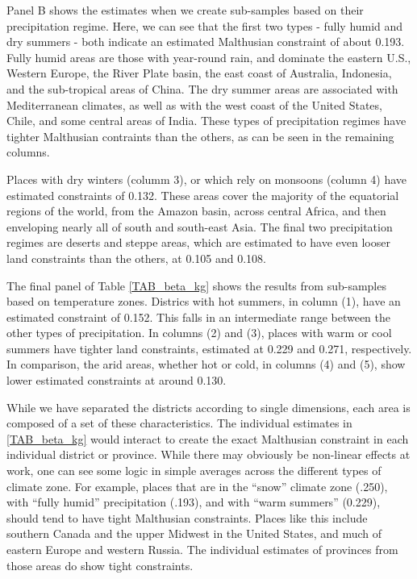 \documentclass[11pt]{article}
\begin{document}
Panel B shows the estimates when we create sub-samples based on their precipitation regime. Here, we can see that the first two types - fully humid and dry summers - both indicate an estimated  Malthusian constraint of about 0.193. Fully humid areas are those with year-round rain, and dominate the eastern U.S., Western Europe, the River Plate basin, the east coast of Australia, Indonesia, and the sub-tropical areas of China. The dry summer areas are associated with Mediterranean climates, as well as with the west coast of the United States, Chile, and some central areas of India. These types of precipitation regimes have tighter Malthusian contraints than the others, as can be seen in the remaining columns.

Places with dry winters (columm 3), or which rely on monsoons (column 4) have estimated constraints of 0.132. These areas cover the majority of the equatorial regions of the world, from the Amazon basin, across central Africa, and then enveloping nearly all of south and south-east Asia. The final two precipitation regimes are deserts and steppe areas, which are estimated to have even looser land constraints than the others, at 0.105 and 0.108. 

The final panel of Table \ref{TAB_beta_kg} shows the results from sub-samples based on temperature zones. Districs with hot summers, in column (1), have an estimated constraint of 0.152. This falls in an intermediate range between the other types of precipitation. In columns (2) and (3), places with warm or cool summers have tighter land constraints, estimated at 0.229 and 0.271, respectively. In comparison, the arid areas, whether hot or cold, in columns (4) and (5), show lower estimated constraints at around 0.130. 

While we have separated the districts according to single dimensions, each area is composed of a set of these characteristics. The individual estimates in \ref{TAB_beta_kg} would interact to create the exact Malthusian constraint in each individual district or province. While there may obviously be non-linear effects at work, one can see some logic in simple averages across the different types of climate zone. For example, places that are in the ``snow'' climate zone (.250), with ``fully humid'' precipitation (.193), and with ``warm summers'' (0.229), should tend to have tight Malthusian constraints. Places like this include southern Canada and the upper Midwest in the United States, and much of eastern Europe and western Russia. The individual estimates of provinces from those areas do show tight constraints.
\end{document}
